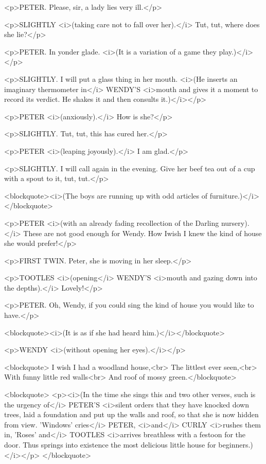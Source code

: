 <p>PETER. Please, sir, a lady lies very ill.</p>

<p>SLIGHTLY <i>(taking care not to fall over her).</i> Tut, tut, where does she lie?</p>

<p>PETER. In yonder glade. <i>(It is a variation of a game they play.)</i></p>

<p>SLIGHTLY. I will put a glass thing in her mouth. <i>(He inserts an imaginary thermometer in</i> WENDY'S <i>mouth and gives it a moment to record its verdict. He shakes it and then consults it.)</i></p>

<p>PETER <i>(anxiously).</i> How is she?</p>

<p>SLIGHTLY. Tut, tut, this has cured her.</p>

<p>PETER <i>(leaping joyously).</i> I am glad.</p>

<p>SLIGHTLY. I will call again in the evening. Give her beef tea out of a cup with a spout to it, tut, tut.</p>

<blockquote><i>(The boys are running up with odd articles of furniture.)</i></blockquote>

<p>PETER <i>(with an already fading recollection of the Darling nursery).</i> These are not good enough for Wendy. How Iwish I knew the kind of house she would prefer!</p>

<p>FIRST TWIN. Peter, she is moving in her sleep.</p>

<p>TOOTLES <i>(opening</i> WENDY'S <i>mouth and gazing down into the depths).</i> Lovely!</p>

<p>PETER. Oh, Wendy, if you could sing the kind of house you would like to have.</p>

<blockquote><i>(It is as if she had heard him.)</i></blockquote>

<p>WENDY <i>(without opening her eyes).</i></p>

<blockquote> I wish I had a woodland house,<br> The littlest ever seen,<br> With funny little red walls<br> And roof of mossy green.</blockquote>

<blockquote> <p><i>(In the time she sings this and two other verses, such is the urgency of</i> PETER'S <i>silent orders that they have knocked down trees, laid a foundation and put up the walls and roof, so that she is now hidden from view. 'Windows' cries</i> PETER, <i>and</i> CURLY <i>rushes them in, 'Roses' and</i> TOOTLES <i>arrives breathless with a festoon for the door. Thus springs into existence the most delicious little house for beginners.)</i></p> </blockquote>

